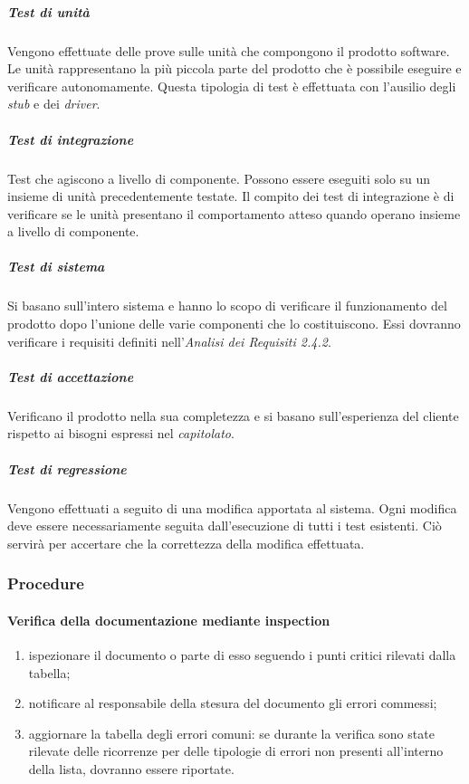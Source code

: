\subparagraph*{Test di unità}
Vengono effettuate delle prove sulle unità che compongono il prodotto software. Le unità rappresentano la più piccola parte del prodotto che è possibile eseguire e verificare autonomamente. Questa tipologia di test è effettuata con l'ausilio degli \textit{stub\glo} e dei \textit{driver\glos}.

\subparagraph*{Test di integrazione}
Test che agiscono a livello di componente. Possono essere eseguiti solo su un insieme di unità precedentemente testate. Il compito dei test di integrazione è di verificare se le unità presentano il comportamento atteso quando operano insieme a livello di componente.

\subparagraph*{Test di sistema}
Si basano sull'intero sistema e hanno lo scopo di verificare il funzionamento del prodotto dopo l'unione delle varie componenti che lo costituiscono. Essi dovranno verificare i requisiti definiti nell'\textit{Analisi dei Requisiti 2.4.2\docs}.

\subparagraph*{Test di accettazione}
Verificano il prodotto nella sua completezza e si basano sull'esperienza del cliente rispetto ai bisogni espressi nel \textit{capitolato\glos}.

\subparagraph*{Test di regressione}
Vengono effettuati a seguito di una modifica apportata al sistema. Ogni modifica deve essere necessariamente seguita dall'esecuzione di tutti i test esistenti. Ciò servirà per accertare che la correttezza della modifica effettuata.


\subsubsection{Procedure}
\paragraph{Verifica della documentazione mediante inspection}
\begin{enumerate}
	\item ispezionare il documento o parte di esso seguendo i punti critici rilevati dalla tabella;
	\item notificare al responsabile della stesura del documento gli errori commessi;
	\item aggiornare la tabella degli errori comuni: se durante la verifica sono state rilevate delle ricorrenze per delle tipologie di errori non presenti all'interno della lista, dovranno essere riportate.
\end{enumerate}
